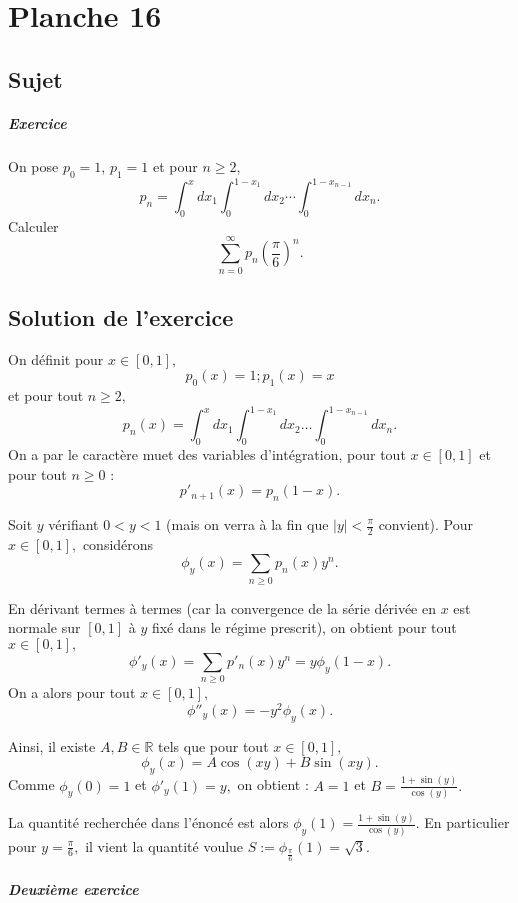 \chapter{Planche 16}

\section{Sujet}

\paragraph{Exercice}
On pose $p_{0}=1$, $p_{1} = 1$ et pour $n\geqslant 2$,
\[
p_{n}=\int_{0}^{x}dx_{1}\int_{0}^{1-x_{1}}dx_{2}\cdots\int_{0}^{1-x_{n-1}}dx_{n}.
\]
Calculer
\[
\sum_{n=0}^\infty p_n \left(\frac\pi6\right)^n.
\]

\section{Solution de l'exercice}

On définit pour $x\in[0,1],$ $$p_{0}(x)=1;p_{1}(x)=x$$et pour tout $n\geq 2,$ $$p_{n}(x)=\int_{0}^{x}dx_{1}\int_{0}^{1-x_{1}}dx_{2}\ldots\int_{0}^{1-x_{n-1}}dx_{n}.$$
On a par le caractère muet des variables d'intégration, pour tout $x\in[0,1]$ et pour tout $n\geq 0$ : $$p'_{n+1}(x)=p_{n}(1-x).$$

Soit $y$ vérifiant $0<y<1$ (mais on verra à la fin que $\vert y\vert <\frac{\pi}{2}$ convient).
Pour $x\in[0,1],$ considérons $$\phi_{y}(x)=\sum_{n\geq 0}p_{n}(x)y^{n}.$$

En dérivant termes à termes (car la convergence de la série dérivée en $x$ est normale sur $[0,1]$ à $y$ fixé dans le régime prescrit), 
on obtient pour tout $x\in[0,1],$ $$\phi'_{y}(x)=\sum_{n\geq 0}p'_{n}(x)y^{n}=y\phi_{y}(1-x).$$
On a alors pour tout $x\in[0,1],$ $$ \phi''_{y}(x)=-y^{2}\phi_{y}(x).$$

Ainsi, il existe $A,B\in\mathbb{R}$ tels que pour tout $x\in[0,1],$ $$ \phi_{y}(x)=A\cos(xy)+B\sin(xy).$$
Comme $\phi_{y}(0)=1$ et $\phi'_{y}(1)=y,$ on obtient : $A=1$ et $\displaystyle B=\frac{1+\sin(y)}{\cos(y)}.$

La quantité recherchée dans l'énoncé est alors $\displaystyle \phi_{y}(1)=\frac{1+\sin(y)}{\cos(y)}.$
En particulier pour $\displaystyle y=\frac{\pi}{6},$ il vient la quantité voulue $\displaystyle S:=\phi_{\frac{\pi}{6}}(1)=\sqrt{3}.$

\paragraph{Deuxième exercice}
